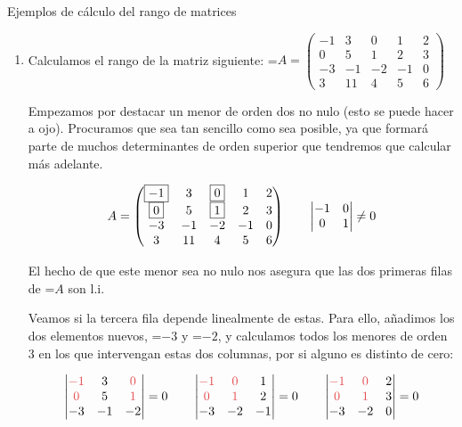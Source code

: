 \documentclass[11pt,a4paper]{article}
\newcommand{\fmm}[1]{\setbox0=\hbox{$#1$}\ifdim\wd0>\linewidth\fmdisp{#1}\else\mbox{\box0}\fi}
\newcommand{\fmdisp}[1]{\[\setbox2=\hbox{$\displaystyle #1$}\ifdim\wd2>\linewidth\resizebox{\linewidth}{!}{\box2}\else\box2\fi\]}
\begin{document}
\begin{fmex}{Ejemplos de cálculo del rango de matrices}
\begin{enumerate}[label=\textbf{\arabic*.},leftmargin=*]
\item Calculamos el rango de la matriz siguiente: \fmm{A=\begin{pmatrix}-1 & 3 & 0 & 1 & 2\\ 0 & 5 & 1 & 2 & 3\\ -3 & -1 & -2 & -1 & 0\\ 3 & 11 & 4 & 5 & 6\end{pmatrix}}

Empezamos por destacar un menor de orden dos no nulo (esto se puede hacer a ojo). Procuramos que sea tan sencillo como sea posible, ya que formará parte de muchos determinantes de orden superior que tendremos que calcular más adelante.

\fmdisp{A=\begin{pmatrix}\boxed{-1} & 3 & \boxed{0} & 1 & 2\\ \boxed{0} & 5 & \boxed{1} & 2 & 3\\ -3 & -1 & -2 & -1 & 0\\ 3 & 11 & 4 & 5 & 6\end{pmatrix}\qquad\begin{vmatrix}-1 & 0\\ 0 & 1\end{vmatrix}\neq0}

El hecho de que este menor sea no nulo nos asegura que las dos primeras filas de \fmm{A} son l.i.

Veamos si la tercera fila depende linealmente de estas. Para ello, añadimos los dos elementos nuevos, \fmm{-3} y \fmm{-2}, y calculamos todos los menores de orden 3 en los que intervengan estas dos columnas, por si alguno es distinto de cero:

\fmdisp{\begin{vmatrix}\color[HTML]{e5484d}-1 & 3 & \color[HTML]{e5484d}0\\ \color[HTML]{e5484d}0 & 5 & \color[HTML]{e5484d}1\\ -3 & -1 & -2\end{vmatrix}=0\qquad\begin{vmatrix}\color[HTML]{e5484d}-1 & \color[HTML]{e5484d}0 & 1\\ \color[HTML]{e5484d}0 & \color[HTML]{e5484d}1 & 2\\ -3 & -2 & -1\end{vmatrix}=0\qquad\begin{vmatrix}\color[HTML]{e5484d}-1 & \color[HTML]{e5484d}0 & 2\\ \color[HTML]{e5484d}0 & \color[HTML]{e5484d}1 & 3\\ -3 & -2 & 0\end{vmatrix}=0}


\end{enumerate}
\end{fmex}
\end{document}
